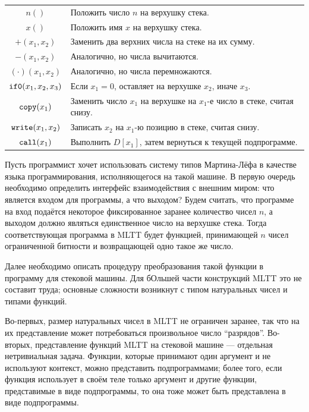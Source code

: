 \documentclass[12pt]{article}
\begin{document}
\begin{center}
\begin{tabular}{|c|l}
  $n()$                     & Положить число $n$ на верхушку стека. \\
  $x()$                     & Положить имя $x$ на верхушку стека. \\
  $+(x_1,x_2)$              & Заменить два верхних числа на стеке на их
                              сумму. \\
  $-(x_1,x_2)$              & Аналогично, но числа вычитаются. \\
  $(\cdot)(x_1,x_2)$        & Аналогично, но числа перемножаются. \\
  $\verb|if0|(x_1,x_2,x_3)$ & Если $x_1 = 0$, оставляет на верхушке $x_2$,
                              иначе $x_3$. \\
  $\verb|copy|(x_1)$        & Заменить число $x_1$ на верхушке на $x_1$-е число
                              в стеке, считая снизу. \\
  $\verb|write|(x_1,x_2)$   & Записать $x_2$ на $x_1$-ю позицию в стеке, считая
                              снизу. \\
  $\verb|call|(x_1)$        & Выполнить $D[x_1]$, затем вернуться к текущей
                              подпрограмме.
\end{tabular}
\end{center}

Пусть программист хочет использовать систему типов Мартина-Лёфа в качестве языка
программирования, исполняющегося на такой машине. В первую очередь необходимо
определить интерфейс взаимодействия с внешним миром: что является входом для
программы, а что выходом? Будем считать, что программе на вход подаётся
некоторое фиксированное заранее количество чисел $n$, а выходом должно являться
единственное число на верхушке стека. Тогда соответствующая программа в MLTT
будет функцией, принимающей $n$ чисел ограниченной битности и возвращающей одно
такое же число.

Далее необходимо описать процедуру преобразования такой функции в программу для
стековой машины. Для бОльшей части конструкций MLTT это не составит труда;
основные сложности возникнут с типом натуральных чисел и типами функций.

Во-первых, размер натуральных чисел в MLTT не ограничен заранее, так что на их
представление может потребоваться произвольное число ``разрядов''. Во-вторых,
представление функций MLTT на стековой машине --- отдельная нетривиальная
задача. Функции, которые принимают один аргумент и не используют контекст, можно
представить подпрограммами; более того, если функция использует в своём теле
только аргумент и другие функции, представимые в виде подпрограммы, то она тоже
может быть представлена в виде подпрограммы.
\end{document}
